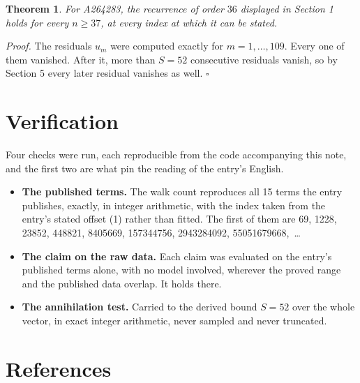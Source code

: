 \documentclass[11pt]{article}
\newtheorem{theorem}{Theorem}
\theoremstyle{definition}
\begin{document}
\begin{theorem} For A264283, the recurrence of order $36$ displayed in Section 1 holds for every $n \ge 37$, at every index at which it can be stated.\end{theorem}

{\itshape Proof.} The residuals $u_m$ were computed exactly for $m = 1,\dots,109$. Every one of them vanished. After it, more than $S = 52$ consecutive residuals vanish, so by Section 5 every later residual vanishes as well. $\square$

\section{Verification}

Four checks were run, each reproducible from the code accompanying this note, and the first two are what pin the reading of the entry's English.

\begin{itemize}

\item {\bfseries The published terms.} The walk count reproduces all 15 terms the entry publishes, exactly, in integer arithmetic, with the index taken from the entry's stated offset (1) rather than fitted. The first of them are 69, 1228, 23852, 448821, 8405669, 157344756, 2943284092, 55051679668,~\dots

\item {\bfseries The claim on the raw data.} Each claim was evaluated on the entry's published terms alone, with no model involved, wherever the proved range and the published data overlap. It holds there.

\item {\bfseries The annihilation test.} Carried to the derived bound $S = 52$ over the whole vector, in exact integer arithmetic, never sampled and never truncated.

\end{itemize}

\section{References}
\end{document}
